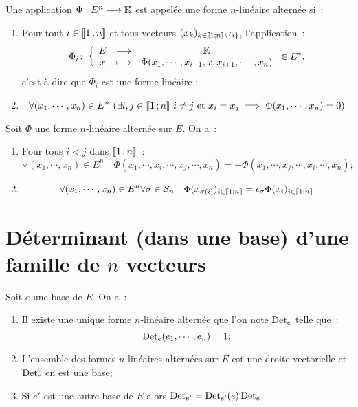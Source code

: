 \begin{defdef}
	Une application $\Phi : E^n \longrightarrow \mathbb{K}$ est appelée une forme $n$-linéaire alternée si~:
	\begin{enumerate}
		\item Pour tout $i \in \mathopen{\llbracket}1\mathclose{}\mathpunct{};n\mathclose{\rrbracket}$ et tous vecteurs $(x_k)_{k \in \mathopen{\llbracket}1\mathclose{}\mathpunct{};n\mathclose{\rrbracket} \setminus \{i\}}$, l'application~:
		\begin{equation}
			\Phi_i\colon \left\{\begin{array}{ccc} E & \longrightarrow &\mathbb{K}\\ x & \longmapsto & \Phi(x_1,\cdots,x_{i-1},x,x_{i+1},\cdots,x_n) \end{array} \right. \in E^*,
		\end{equation}
		c'est-à-dire que $\Phi_i$ est une forme linéaire ;
		\item
		\begin{equation}
			\forall (x_1, \cdots, x_n) \in E^n \ (\exists i,j \in \intervalleentier{1}{n} \ i \neq j \ \text{et} \ x_i=x_j \implies \Phi(x_1, \cdots, x_n) = 0) 
		\end{equation}		
	\end{enumerate}
\end{defdef}

\begin{prop}
	Soit $\Phi$ une forme $n$-linéaire alternée sur $E$. On a~:
	\begin{enumerate}
		\item Pour tous $i < j$ dans $\mathopen{\llbracket}1\mathclose{}\mathpunct{};n\mathclose{\rrbracket}$~:
		\begin{equation}
			\forall (x_1, \cdots, x_n) \in E^n \quad \Phi(x_1, \cdots, x_i, \cdots, x_j, \cdots,x_n) = - \Phi(x_1, \cdots, x_j, \cdots, x_i, \cdots,x_n) ;
		\end{equation}
		\item 
		\begin{equation}
			\forall (x_1, \cdots, x_n) \in E^n \forall \sigma \in \mathcal{S}_n \quad \Phi(x_{\sigma(i)})_{i \in \mathopen{\llbracket}1\mathclose{}\mathpunct{};n\mathclose{\rrbracket}} = \epsilon_\sigma \Phi(x_{i})_{i \in \mathopen{\llbracket}1\mathclose{}\mathpunct{};n\mathclose{\rrbracket}}
		\end{equation}
	\end{enumerate}
\end{prop}

\section[Déterminant]{Déterminant (dans une base) d'une famille de $n$ vecteurs}

\begin{theo}
	
	Soit $e$ une base de $E$. On a~:
	\begin{enumerate}
		\item Il existe une unique forme $n$-linéaire alternée que l'on note $\operatorname{Det}_e$ telle que~:
		\begin{equation}
			\operatorname{Det}_e(e_1, \cdots, e_n)=1;
		\end{equation}
	\item L'ensemble des formes $n$-linéaires alternées sur $E$ est une droite vectorielle et $\operatorname{Det}_e$ en est une base;
	\item Si $e'$ est une autre base de $E$ alors $\operatorname{Det}_{e'} = \operatorname{Det}_{e'}(e) \operatorname{Det}_{e}$.
	\end{enumerate}
\end{theo}

